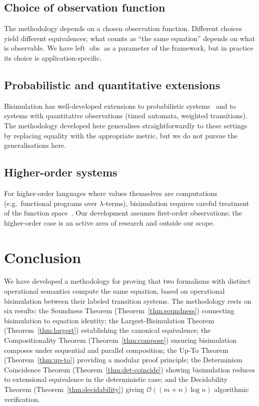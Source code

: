 \documentclass[twocolumn,11pt,a4paper]{article}
\DeclareMathOperator{\obs}{obs}
\begin{document}
\subsection{Choice of observation function}

The methodology depends on a chosen observation function. Different choices yield different equivalences; what counts as ``the same equation'' depends on what is observable. We have left $\obs$ as a parameter of the framework, but in practice its choice is application-specific.

\subsection{Probabilistic and quantitative extensions}

Bisimulation has well-developed extensions to probabilistic systems~\citep{larsen1991bisimulation} and to systems with quantitative observations (timed automata, weighted transitions). The methodology developed here generalises straightforwardly to these settings by replacing equality with the appropriate metric, but we do not pursue the generalisations here.

\subsection{Higher-order systems}

For higher-order languages where values themselves are computations (e.g.\ functional programs over $\lambda$-terms), bisimulation requires careful treatment of the function space~\citep{abramsky1990lazy,gordon1995bisimilarity}. Our development assumes first-order observations; the higher-order case is an active area of research and outside our scope.

\section{Conclusion}
\label{sec:conclusion}

We have developed a methodology for proving that two formalisms with distinct operational semantics compute the same equation, based on operational bisimulation between their labeled transition systems. The methodology rests on six results: the Soundness Theorem (Theorem~\ref{thm:soundness}) connecting bisimulation to equation identity; the Largest-Bisimulation Theorem (Theorem~\ref{thm:largest}) establishing the canonical equivalence; the Compositionality Theorem (Theorem~\ref{thm:compose}) ensuring bisimulation composes under sequential and parallel composition; the Up-To Theorem (Theorem~\ref{thm:up-to}) providing a modular proof principle; the Determinism Coincidence Theorem (Theorem~\ref{thm:det-coincide}) showing bisimulation reduces to extensional equivalence in the deterministic case; and the Decidability Theorem (Theorem~\ref{thm:decidability}) giving $\mathcal{O}((m+n)\log n)$ algorithmic verification.
\end{document}
